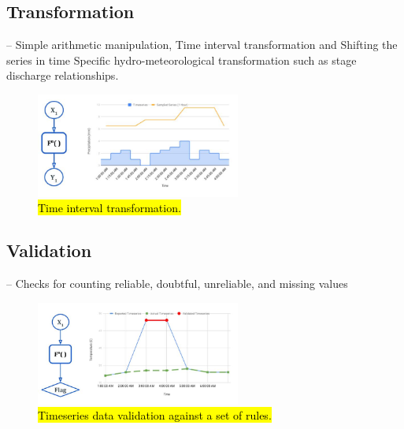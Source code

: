 \subsection{Transformation}-- Simple arithmetic manipulation, Time interval transformation and Shifting the series in time Specific hydro-meteorological transformation such as stage discharge relationships.
\begin{figure}[htp]
    \centering
    \includegraphics[width=0.6\textwidth]{method/data_preprocess/transformation.jpg}
    \caption{\hl{Time interval transformation.}}
    \label{fi:transformation}
\end{figure}

\subsection{Validation}-- Checks for counting reliable, doubtful, unreliable, and missing values
\begin{figure}[htp]
    \centering
    \includegraphics[width=0.6\textwidth]{method/data_preprocess/validation.jpg}
    \caption{\hl{Timeseries data validation against a set of rules.}}
    \label{fi:validation}
\end{figure}

